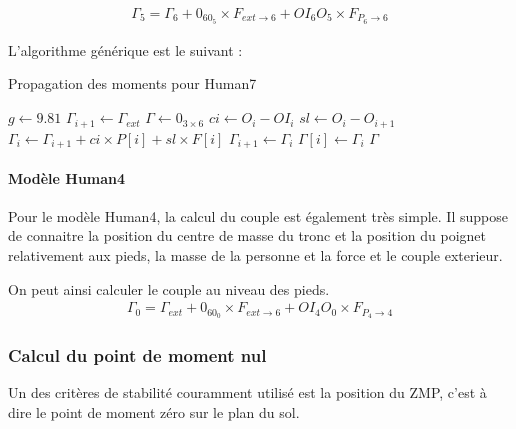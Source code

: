\documentclass[a4paper, 10pt ]{article}
\begin{document}
\begin{align}
\Gamma_5 = \Gamma_6+ 0_60_5\times F_{ext\rightarrow 6} + OI_6O_5\times  F_{P_6\rightarrow 6}
\end{align}

L'algorithme générique est le suivant : 
\begin{algorithm}[h]
\caption{Propagation des moments pour Human7}
\begin{algorithmic}[1]
\STATE $g \leftarrow 9.81$
\STATE $\Gamma_{i+1} \leftarrow \Gamma_{ext}$
\STATE $\Gamma\leftarrow 0_{3\times6}$
	\STATE $ci\leftarrow O_i-OI_i$
	\STATE $sl\leftarrow O_i-O_{i+1}$
	\STATE $\Gamma _i \leftarrow \Gamma _{i+1}+ci\times P[i]+sl\times F[i]$
	\STATE $\Gamma _{i+1}\leftarrow\Gamma _i$ 
	\STATE $\Gamma[i]\leftarrow\Gamma _i$
\ENDFOR
\RETURN $\Gamma$
\end{algorithmic}
\end{algorithm}

\paragraph{Modèle Human4}

Pour le modèle Human4, la calcul du couple est également très simple. Il suppose de connaitre la position du centre de masse du tronc et la position du poignet relativement aux pieds, la masse de la personne et la force et le couple exterieur.

On peut ainsi calculer le couple au niveau des pieds.
\begin{align}
\Gamma_0= \Gamma_{ext}+ 0_60_0\times F_{ext\rightarrow 6} + OI_4O_0\times  F_{P_4\rightarrow 4}
\end{align}


\subsubsection{Calcul du point de moment nul}

Un des critères de stabilité couramment utilisé est la position du ZMP, c'est à dire le point de moment zéro sur le plan du sol.
\end{document}
